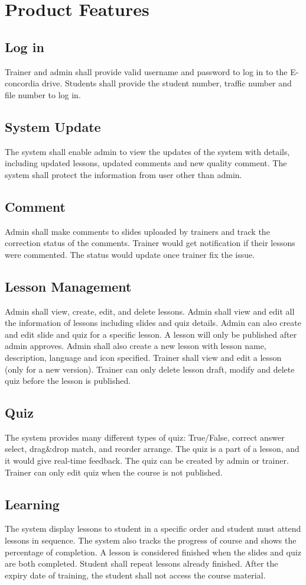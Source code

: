 \documentclass[a4paper]{article}
\begin{document}
\bigskip
\section{Product Features}
\subsection{Log in}
Trainer and admin shall provide valid username and password to log in to the E-concordia drive. 
Students shall provide the student number, traffic number and file number to log in.
\bigskip
\subsection{System Update}
The system shall enable admin to view the updates of the system with details, including updated lessons, updated comments and new quality comment. The system shall protect the information from user other than admin.
\bigskip
\subsection{Comment}
Admin shall make comments to slides uploaded by trainers and track the correction status of the comments.  Trainer would get notification if their lessons were commented. The status would update once trainer fix the issue.
\bigskip
\subsection{Lesson Management}
Admin shall view, create, edit, and delete lessons. Admin shall view and edit all the information of lessons including slides and quiz details. Admin can also create and edit slide and quiz for a specific lesson. A lesson will only be published after admin approves. Admin shall also create a new lesson with lesson name, description, language and icon specified.
Trainer shall view and edit a lesson (only for a new version). Trainer can only delete lesson draft, modify and delete quiz before the lesson is published.
\bigskip
\subsection{Quiz}
The system provides many different types of quiz: True/False, correct answer select, drag\&drop match, and reorder arrange. The quiz is a part of a lesson, and it would give real-time feedback. The quiz can be created by admin or trainer. Trainer can only edit quiz when the course is not published.
\bigskip
\subsection{Learning}
The system display lessons to student in a specific order and student must attend lessons in sequence. The system also tracks the progress of course and shows the percentage of completion. A lesson is considered finished when the slides and quiz are both completed. Student shall repeat lessons already finished. After the expiry date of training, the student shall not access the course material. 
\bigskip
\end{document}
